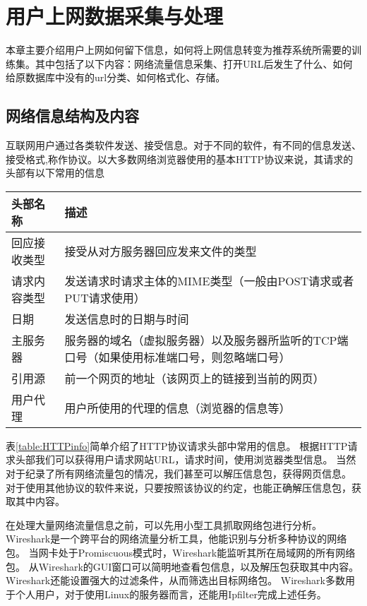 \chapter{用户上网数据采集与处理}
本章主要介绍用户上网如何留下信息，如何将上网信息转变为推荐系统所需要的训练集。其中包括了以下内容：网络流量信息采集、打开URL后发生了什么、如何给原数据库中没有的url分类、如何格式化、存储。

\section{网络信息结构及内容}
互联网用户通过各类软件发送、接受信息。对于不同的软件，有不同的信息发送、接受格式,称作协议。以大多数网络浏览器使用的基本HTTP协议来说，其请求的头部有以下常用的信息 \\
\begin{center}
\label{table:HTTPinfo}
\begin{tabular}{l|p{10cm}}
 \hline
头部名称 & 描述 \\ \hline
回应接收类型 & 接受从对方服务器回应发来文件的类型 \\ \hline
请求内容类型 & 发送请求时请求主体的MIME类型（一般由POST请求或者PUT请求使用） \\ \hline
日期 & 发送信息时的日期与时间 \\ \hline
主服务器 & 服务器的域名（虚拟服务器）以及服务器所监听的TCP端口号（如果使用标准端口号，则忽略端口号） \\ \hline
引用源 & 前一个网页的地址（该网页上的链接到当前的网页） \\ \hline
用户代理 & 用户所使用的代理的信息（浏览器的信息等） \\
\hline
\end{tabular}
\end{center}

表\ref{table:HTTPinfo}简单介绍了HTTP协议请求头部中常用的信息。
根据HTTP请求头部我们可以获得用户请求网站URL，请求时间，使用浏览器类型信息。
当然对于纪录了所有网络流量包的情况，我们甚至可以解压信息包，获得网页信息。
对于使用其他协议的软件来说，只要按照该协议的约定，也能正确解压信息包，获取其中内容。

在处理大量网络流量信息之前，可以先用小型工具抓取网络包进行分析。
Wireshark是一个跨平台的网络流量分析工具，他能识别与分析多种协议的网络包。
当网卡处于Promiscuous模式时，Wireshark能监听其所在局域网的所有网络包。
从Wireshark的GUI窗口可以简明地查看包信息，以及解压包获取其中内容。
Wireshark还能设置强大的过滤条件，从而筛选出目标网络包。
Wireshark多数用于个人用户，对于使用Linux的服务器而言，还能用Ipfilter完成上述任务。


